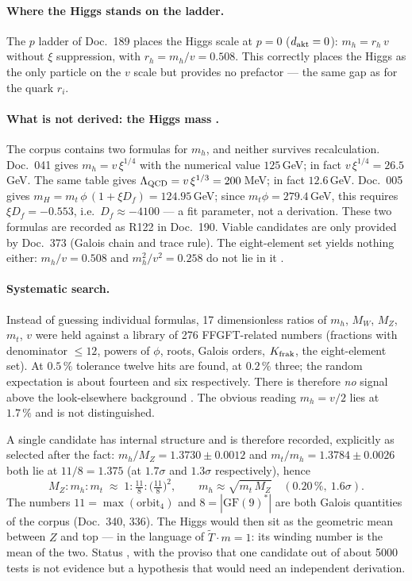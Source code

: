 \paragraph{Where the Higgs stands on the ladder.}
The $p$ ladder of Doc.~189 places the Higgs scale at $p = 0$
($d_{\rm akt} = 0$): $m_h = r_h\,v$ without $\xi$ suppression, with
$r_h = m_h/v = 0.508$. This correctly places the Higgs as the only particle
on the $v$ scale but provides no prefactor --- the same gap as for the quark
$r_i$.

\paragraph{What is not derived: the Higgs mass \XM.}
The corpus contains two formulas for $m_h$, and neither survives
recalculation. Doc.~041 gives $m_h = v\,\xi^{1/4}$ with the numerical value
$125$\,GeV; in fact $v\,\xi^{1/4} = 26.5$\,GeV. The same table gives
$\Lambda_{\rm QCD} = v\,\xi^{1/3} = 200$\,MeV; in fact $12.6$\,GeV. Doc.~005
gives $m_H = m_t\,\phi\,(1+\xi D_f) = 124.95$\,GeV; since
$m_t\phi = 279.4$\,GeV, this requires $\xi D_f = -0.553$, i.e.\
$D_f\approx-4100$ --- a fit parameter, not a derivation. These two formulas
are recorded as R122 in Doc.~190. Viable candidates are only provided by
Doc.~373 (Galois chain and trace rule). The eight-element set yields nothing
either: $m_h/v = 0.508$ and $m_h^2/v^2 = 0.258$ do not lie in it \XM.

\paragraph{Systematic search.}
Instead of guessing individual formulas, 17 dimensionless ratios of $m_h$,
$M_W$, $M_Z$, $m_t$, $v$ were held against a library of 276 FFGFT-related
numbers (fractions with denominator $\le 12$, powers of $\phi$, roots, Galois
orders, $K_{\rm frak}$, the eight-element set). At $0.5\,\%$ tolerance twelve
hits are found, at $0.2\,\%$ three; the random expectation is about fourteen
and six respectively. There is therefore \emph{no} signal above the
look-elsewhere background \XM. The obvious reading $m_h = v/2$ lies at
$1.7\,\%$ and is not distinguished.

A single candidate has internal structure and is therefore recorded,
explicitly as selected after the fact: $m_h/M_Z = 1.3730 \pm 0.0012$ and
$m_t/m_h = 1.3784 \pm 0.0026$ both lie at $11/8 = 1.375$ (at $1.7\sigma$ and
$1.3\sigma$ respectively), hence
\[
  M_Z : m_h : m_t \;\approx\; 1 : \tfrac{11}{8} : \bigl(\tfrac{11}{8}\bigr)^2,
  \qquad m_h \approx \sqrt{m_t\,M_Z} \quad (0.20\,\%,\ 1.6\sigma).
\]
The numbers $11 = \max(\text{orbit}_4)$ and $8 = |\mathrm{GF}(9)^*|$ are both
Galois quantities of the corpus (Doc.~340, 336). The Higgs would then sit as
the geometric mean between $Z$ and top --- in the language of
$\tilde T\cdot m = 1$: its winding number is the mean of the two. Status
\SM, with the proviso that one candidate out of about 5000 tests is not
evidence but a hypothesis that would need an independent derivation.


